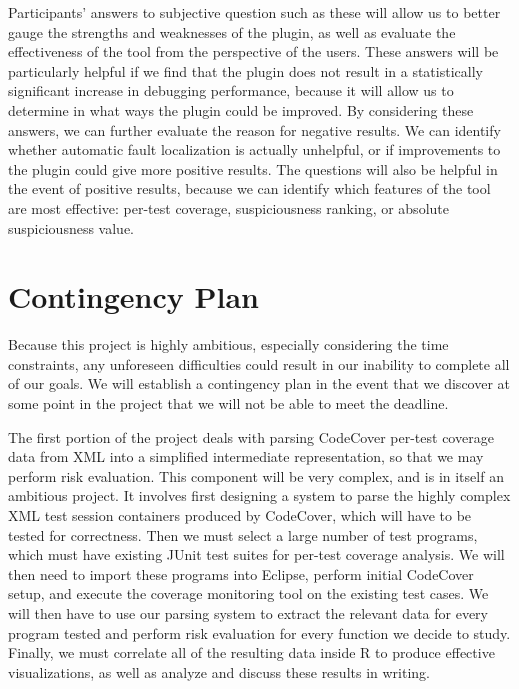 Participants' answers to subjective question such as these will allow us to better
gauge the strengths and weaknesses of the plugin, as well as evaluate the effectiveness
of the tool from the perspective of the users.  These answers will be particularly helpful
if we find that the plugin does not result in a statistically significant increase in 
debugging performance, because it will allow us to determine in what ways the plugin 
could be improved.  By considering these answers, we can further evaluate the
reason for negative results.  We can identify whether automatic fault localization is
actually unhelpful, or if improvements to the plugin could give more positive results.
The questions will also be helpful in the event of positive results, because we can
identify which features of the tool are most effective: per-test coverage, suspiciousness
ranking, or absolute suspiciousness value.

\section{Contingency Plan}\label{sec:addcont}

Because this project is highly ambitious, especially considering the time constraints, 
any unforeseen difficulties could result in our inability to complete all of our goals.
We will establish a contingency plan in the event that we discover at some point
in the project that we will not be able to meet the deadline.

The first portion of the project deals with parsing CodeCover per-test coverage data
from XML into a simplified intermediate representation, so that we may perform risk
evaluation.  This component will be very complex, and is in itself an ambitious project.
It involves first designing a system to parse the highly complex XML test session
containers produced by CodeCover, which will have to be tested for correctness.  Then 
we must select a large number of test programs, which must have existing JUnit test
suites for per-test coverage analysis.  We will then need to import these programs into
Eclipse, perform initial CodeCover setup, and execute the coverage monitoring tool on 
the existing test cases.  We will then have to use our parsing system to extract the 
relevant data for every program tested and perform risk evaluation for every function
we decide to study.  Finally, we must correlate all of the resulting data inside R
to produce effective visualizations, as well as analyze and discuss these results in
writing.  


